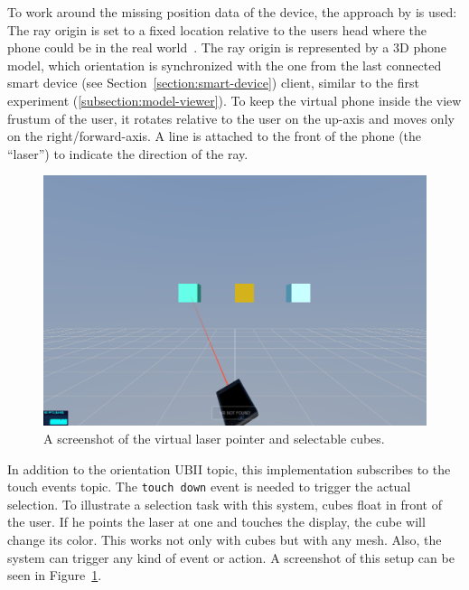 To work around the missing position data of the device, the approach by \citeauthor{Pietroszek.2014} is used: The ray origin is set to a fixed location relative to the users head where the phone could be in the real world~\cite[Figure 3]{Pietroszek.2014}. The ray origin is represented by a \ac{3D} phone model, which orientation is synchronized with the one from the last connected smart device (see Section~\ref{section:smart-device}) client, similar to the first experiment (\ref{subsection:model-viewer}). To keep the virtual phone inside the view frustum of the user, it rotates relative to the user on the up-axis and moves only on the right/forward-axis.
A line is attached to the front of the phone (the \enquote{laser}) to indicate the direction of the ray.

\begin{figure}[H]
  \centering
  \includegraphics[width=12cm]{figures/implementation/screenshot_exp_lp.png}
  \caption[Screenshot of the laser pointer experiment]{A screenshot of the virtual laser pointer and selectable cubes.}\label{fig:screenshot-exp-lp}
\end{figure}

In addition to the orientation \ac{UBII} topic, this implementation subscribes to the touch events topic. The \lstinline{touch down} event is needed to trigger the actual selection.
To illustrate a selection task with this system, cubes float in front of the user. If he points the laser at one and touches the display, the cube will change its color. This works not only with cubes but with any mesh. Also, the system can trigger any kind of event or action. A screenshot of this setup can be seen in Figure~\ref{fig:screenshot-exp-lp}.


